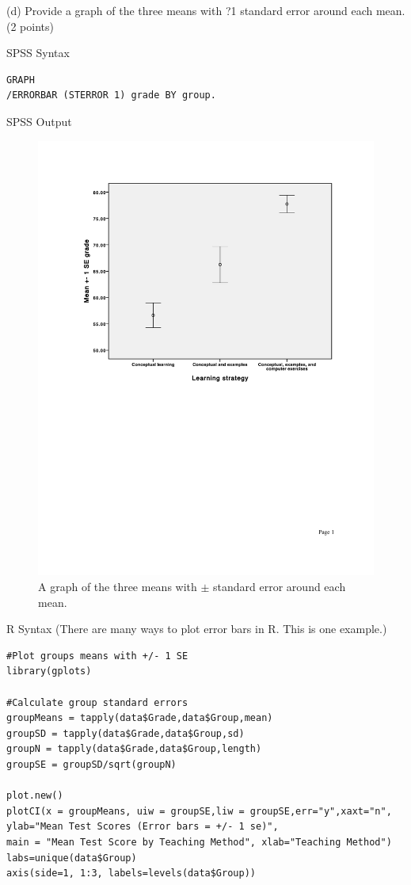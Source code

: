 \documentclass[11pt, oneside]{article}   	%
\begin{document}
(d) Provide a graph of the three means with ?1 standard error around each mean. (2 points)

SPSS Syntax
\begin{lstlisting}[style=SPSSstyle]
GRAPH 
/ERRORBAR (STERROR 1) grade BY group.
\end{lstlisting}

SPSS Output
\begin{figure}[h!]
  \centering
  \includegraphics[width=\linewidth]{2dplotSPSS.pdf}
  \caption{A graph of the three means with $\pm$ standard error around each mean.}
  \label{fig:SPSS1}
\end{figure}

R Syntax (There are many ways to plot error bars in R. This is one example.)
\begin{lstlisting}[language=Rplus]
#Plot groups means with +/- 1 SE
library(gplots)

#Calculate group standard errors
groupMeans = tapply(data$Grade,data$Group,mean)
groupSD = tapply(data$Grade,data$Group,sd)
groupN = tapply(data$Grade,data$Group,length)
groupSE = groupSD/sqrt(groupN)

plot.new()
plotCI(x = groupMeans, uiw = groupSE,liw = groupSE,err="y",xaxt="n",
ylab="Mean Test Scores (Error bars = +/- 1 se)",
main = "Mean Test Score by Teaching Method", xlab="Teaching Method")
labs=unique(data$Group)
axis(side=1, 1:3, labels=levels(data$Group))
\end{lstlisting}
\end{document}
